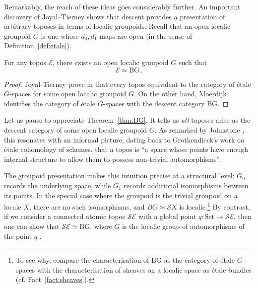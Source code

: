 \documentclass[a4paper, 11pt,reqno]{amsart}
\newcommand{\calE}{\mathcal{E}}
\newcommand{\calS}{\mathcal{S}}
\newcommand{\Set}{\mathrm{Set}}
\newcommand{\baseS}{\mathcal{S}}
\newcommand{\E}{\mathcal{E}}
\newcommand{\BG}{\mathrm{BG}}
\begin{document}
Remarkably, the reach of these ideas goes considerably further. An important discovery of Joyal--Tierney shows that descent provides a presentation of arbitrary toposes in terms of localic groupoids. Recall that an open localic groupoid $G$ is one whose $d_0,d_1$ maps are open (in the sense of Definition~\ref{def:etale}). 

\begin{theorem}\label{thm:BG} For any topos $\calE$, there exists an open localic groupoid $G$ such that 
	$$\E\simeq \BG\,.$$
\end{theorem}
\begin{proof} Joyal-Tierney prove in \cite[Theorem VIII.3.2]{JoyalTierney} that every topos equivalent to the category of \'{e}tale $G$-spaces for some open localic groupoid $G$. On the other hand, Moerdijk \cite[\S 4.2 and \S 5.2]{Moerdijk} identifies the category of \'{e}tale $G$-spaces with the descent category $\BG$.
\end{proof}

\begin{discussion}\label{dis:descentAUTOMORPHISMS} Let us pause to appreciate Theorem~\ref{thm:BG}. It tells us \emph{all} toposes arise as the descent category of some open localic groupoid $G$. As remarked by Johnstone \cite[C5.1]{Elephant}, this resonates with an informal picture, dating back to Grothendieck's work on \'{e}tale cohomology of schemes, that a topos is ``a space whose points have enough internal structure to allow them to possess non-trivial automorphisms''.

The groupoid presentation makes this intuition precise at a structural level: $G_0$ records the underlying space, while $G_1$ records additional isomorphisms between its points. In the special case where the groupoid is the trivial groupoid on a locale $X$, there are no such isomorphisms, and $BG\simeq\baseS X$ is localic.\footnote{To see why, compare the characterisation of $\BG$ as the category of \'{e}tale $G$-spaces \cite[\S 5.2]{Moerdijk} with the characterisation of sheaves on a localic space as \'{e}tale bundles (cf. Fact~\ref{fact:sheaves}).} By contrast, if we consider a connected atomic topos $\baseS\E$ with a global point $q\colon \Set\to \calS\E$, then one can show that $\baseS\E\simeq \BG$, where $G$ is the localic group of automorphisms of the point $q$ \cite[Remark C5.2.14(c)]{Elephant}.
\end{discussion}
\end{document}
